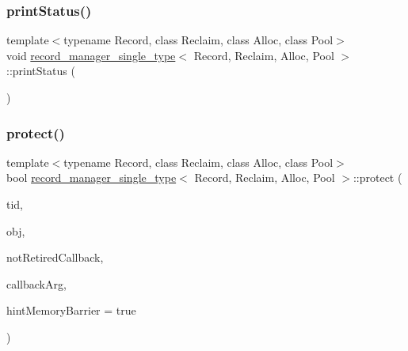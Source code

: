\subsubsection{\texorpdfstring{print\+Status()}{printStatus()}}
{\footnotesize\ttfamily template$<$typename Record, class Reclaim, class Alloc, class Pool$>$ \\
void \hyperlink{classrecord__manager__single__type}{record\+\_\+manager\+\_\+single\+\_\+type}$<$ Record, Reclaim, Alloc, Pool $>$\+::print\+Status (\begin{DoxyParamCaption}\item[{void}]{ }\end{DoxyParamCaption})\hspace{0.3cm}{\ttfamily [inline]}}

\mbox{\label{classrecord__manager__single__type_a01a1d6fd1820e8430b4304c58d55582d}} 
\subsubsection{\texorpdfstring{protect()}{protect()}}
{\footnotesize\ttfamily template$<$typename Record, class Reclaim, class Alloc, class Pool$>$ \\
bool \hyperlink{classrecord__manager__single__type}{record\+\_\+manager\+\_\+single\+\_\+type}$<$ Record, Reclaim, Alloc, Pool $>$\+::protect (\begin{DoxyParamCaption}\item[{const int}]{tid,  }\item[{\hyperlink{classrecord__manager__single__type_a065f05d1a84e619758122b3da04b1327}{record\+\_\+pointer}}]{obj,  }\item[{\hyperlink{globals_8h_a57f5c0d40b156d7d996492fb2f16e3cd}{Callback\+Type}}]{not\+Retired\+Callback,  }\item[{\hyperlink{globals_8h_a3de64ef48066ac6430631c8b81a15345}{Callback\+Arg}}]{callback\+Arg,  }\item[{bool}]{hint\+Memory\+Barrier = {\ttfamily true} }\end{DoxyParamCaption})\hspace{0.3cm}{\ttfamily [inline]}}

\mbox{\label{classrecord__manager__single__type_ad97c74b60bf8a3d3670437806318d51f}} 

